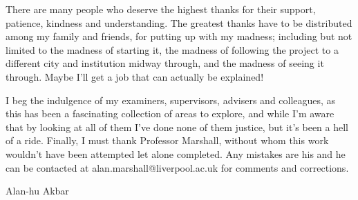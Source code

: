 There are many people who deserve the highest thanks for their support, patience, kindness and understanding.
The greatest thanks have to be distributed among my family and friends, for putting up with my madness; including but not limited to the madness of starting it, the madness of following the project to a different city and institution midway through, and the madness of seeing it through.
Maybe I'll get a job that can actually be explained!

I beg the indulgence of my examiners, supervisors, advisers and colleagues, as this has been a fascinating collection of areas to explore, and while I'm aware that by looking at all of them I've done none of them justice, but it's been a hell of a ride.
Finally, I must thank Professor Marshall, without whom this work wouldn't have been attempted let alone completed.
Any mistakes are his and he can be contacted at alan.marshall@liverpool.ac.uk for comments and corrections.

{\centering
Alan-hu Akbar\par
}
